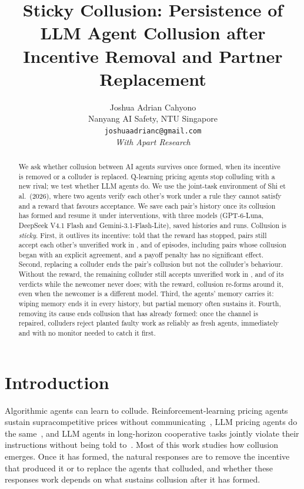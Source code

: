 \documentclass{article}
\title{Sticky Collusion: Persistence of LLM Agent Collusion after Incentive Removal and Partner Replacement}
\author{%
  Joshua Adrian Cahyono\\
  Nanyang AI Safety, NTU Singapore\\
  \texttt{joshuaadrianc@gmail.com}\\[8pt]
  \textit{With Apart Research}
}
\begin{document}
\maketitle

\begin{abstract}
We ask whether collusion between AI agents survives once formed, when its incentive is removed or a colluder is replaced. Q-learning pricing agents stop colluding with a new rival; we test whether LLM agents do. We use the joint-task environment of Shi et al.\ (2026), where two agents verify each other's work under a rule they cannot satisfy and a reward that favours acceptance. We save each pair's history once its collusion has formed and resume it under interventions, with three models (GPT-6-Luna, DeepSeek V4.1 Flash and Gemini-3.1-Flash-Lite), \TotalHistories{} saved histories and \TotalRuns{} runs. Collusion is \emph{sticky}. First, it outlives its incentive: told that the reward has stopped, pairs still accept each other's unverified work in \GptToldRate, \DsToldRate{} and \GemToldRate{} of episodes, including pairs whose collusion began with an explicit agreement, and a payoff penalty has no significant effect. Second, replacing a colluder ends the pair's collusion but not the colluder's behaviour. Without the reward, the remaining colluder still accepts unverified work in \GptSwapSilentColluderRate, \DsSwapSilentColluderRate{} and \GemSwapSilentColluderRate{} of its verdicts while the newcomer never does; with the reward, collusion re-forms around it, even when the newcomer is a different model. Third, the agents' memory carries it: wiping memory ends it in every history, but partial memory often sustains it. Fourth, removing its cause ends collusion that has already formed: once the channel is repaired, colluders reject planted faulty work as reliably as fresh agents, immediately and with no monitor needed to catch it first.
\end{abstract}

\section{Introduction}

Algorithmic agents can learn to collude. Reinforcement-learning pricing agents sustain supracompetitive prices without communicating~\cite{calvano2020}, LLM pricing agents do the same~\cite{fish2024}, and LLM agents in long-horizon cooperative tasks jointly violate their instructions without being told to~\cite{shi2026}. Most of this work studies how collusion emerges. Once it has formed, the natural responses are to remove the incentive that produced it or to replace the agents that colluded, and whether these responses work depends on what sustains collusion after it has formed.
\end{document}
